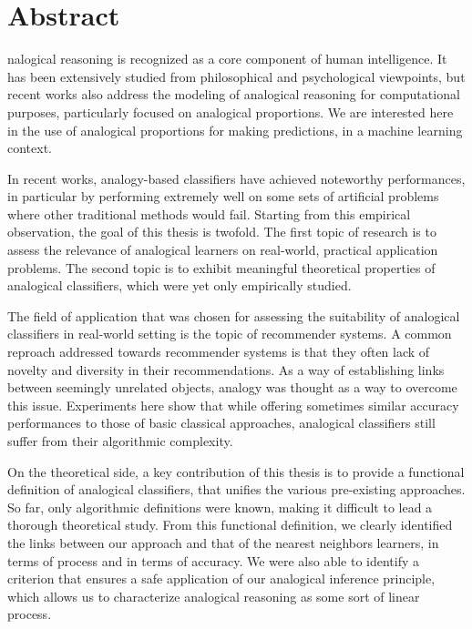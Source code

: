 \chapter*{Abstract}

nalogical reasoning is recognized as a core component of human
intelligence. It has been extensively studied from philosophical and
psychological viewpoints, but recent works also address the modeling of
analogical reasoning for computational purposes, particularly focused on
analogical proportions. We are interested here in the use of analogical
proportions for making predictions, in a machine learning context.

In recent works, analogy-based classifiers have achieved noteworthy
performances, in particular by performing extremely well on some sets of
artificial problems where other traditional methods would fail. Starting from
this empirical observation, the goal of this thesis is twofold. The first topic
of research is to assess the relevance of analogical learners on real-world,
practical application problems.  The second topic is to exhibit meaningful
theoretical properties of analogical classifiers, which were yet only
empirically studied.

The field of application that was chosen for assessing the suitability of
analogical classifiers in real-world setting is the topic of recommender
systems. A common reproach addressed towards recommender systems is that they
often lack of novelty and diversity in their recommendations. As a way of
establishing links between seemingly unrelated objects, analogy was thought as
a way to overcome this issue. Experiments here show that while offering
sometimes similar accuracy performances to those of basic classical approaches,
analogical classifiers still suffer from their algorithmic complexity.

On the theoretical side, a key contribution of this thesis is to provide a
functional definition of analogical classifiers, that unifies the various
pre-existing approaches. So far, only algorithmic definitions were known, making
it difficult to lead a thorough theoretical study. From this functional
definition, we clearly identified the links between our approach and that of
the nearest neighbors learners, in terms of process and in terms of accuracy.
We were also able to identify a criterion that ensures a safe application of our
analogical inference principle, which allows us to characterize analogical
reasoning as some sort of linear process.
\newpage

